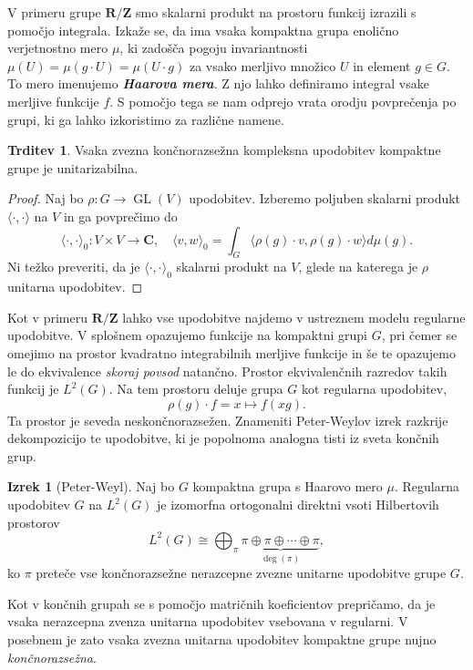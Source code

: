 \documentclass[11pt]{book}
\def\ZZ{\mathbf{Z}}
\def\RR{\mathbf{R}}
\def\CC{\mathbf{C}}
\DeclareMathOperator\GL{GL}
\def\definicija{\color{rdeca}\bf\em}
\theoremstyle{definition}
\theoremstyle{zgled}
\theoremstyle{odprtproblem}
\theoremstyle{domacanaloga}
\newenvironment{dokaz}
    {\color{siva}\begin{proof}}
    {\end{proof}}
\theoremstyle{izrek}
\newtheorem*{izrek}{Izrek}
\newtheorem*{trditev}{Trditev}
\begin{document}
V primeru grupe $\RR/\ZZ$ smo skalarni produkt na prostoru funkcij izrazili s pomočjo integrala. Izkaže se, da ima vsaka kompaktna grupa enolično verjetnostno mero $\mu$, ki zadošča pogoju invariantnosti $\mu(U) = \mu(g \cdot U) = \mu(U \cdot g)$ za vsako merljivo množico $U$ in element $g \in G$. To mero imenujemo {\definicija Haarova mera}. Z njo lahko definiramo integral vsake merljive funkcije $f$. S pomočjo tega se nam odprejo vrata orodju povprečenja po grupi, ki ga lahko izkoristimo za različne namene.

\begin{trditev}
Vsaka zvezna končnorazsežna kompleksna upodobitev kompaktne grupe je unitarizabilna.
\end{trditev}
\begin{dokaz}
Naj bo $\rho \colon G \to \GL(V)$ upodobitev. Izberemo poljuben skalarni produkt $\langle \cdot, \cdot \rangle$ na $V$ in ga povprečimo do
\[
    \langle \cdot, \cdot \rangle_0 \colon V \times V \to \CC, \quad
    \langle v, w \rangle_0 = \int_{G} \langle \rho(g) \cdot v, \rho(g) \cdot w \rangle d \mu (g).
\]
Ni težko preveriti, da je $\langle \cdot, \cdot \rangle_0$ skalarni produkt na $V$, glede na katerega je $\rho$ unitarna upodobitev.
\end{dokaz}

Kot v primeru $\RR/\ZZ$ lahko vse upodobitve najdemo v ustreznem modelu regularne upodobitve. V splošnem opazujemo funkcije na kompaktni grupi $G$, pri čemer se omejimo na prostor kvadratno integrabilnih merljive funkcije in še te opazujemo le do ekvivalence \emph{skoraj povsod} natančno. Prostor ekvivalenčnih razredov takih funkcij je $L^2(G)$. Na tem prostoru deluje grupa $G$ kot regularna upodobitev,
\[
    \rho(g) \cdot f = x \mapsto f(x g).
\]
Ta prostor je seveda neskončnorazsežen. Znameniti Peter-Weylov izrek razkrije dekompozicijo te upodobitve, ki je popolnoma analogna tisti iz sveta končnih grup.

\begin{izrek}[Peter-Weyl]
Naj bo $G$ kompaktna grupa s Haarovo mero $\mu$. Regularna upodobitev $G$ na $L^2(G)$ je izomorfna ortogonalni direktni vsoti Hilbertovih prostorov
\[
    L^2(G) \cong \bigoplus_{\pi} \underbrace{\pi \oplus \pi \oplus \cdots \oplus \pi}_{\deg(\pi)},
\]
ko $\pi$ preteče vse končnorazsežne nerazcepne zvezne unitarne upodobitve grupe $G$.
\end{izrek}

Kot v končnih grupah se s pomočjo matričnih koeficientov prepričamo, da je vsaka nerazcepna zvenza unitarna upodobitev vsebovana v regularni. V posebnem je zato vsaka zvezna unitarna upodobitev kompaktne grupe nujno \emph{končnorazsežna}.
\end{document}

